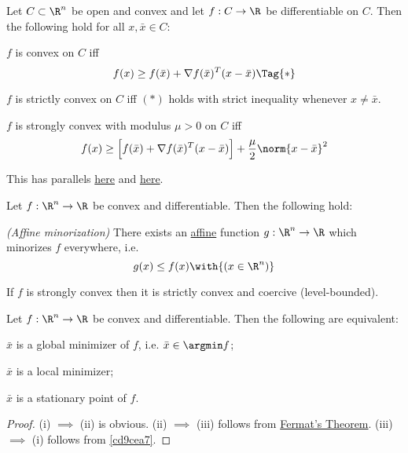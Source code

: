 Let $C\subset\R^n$ be open and convex and let $f:C\to\R$ be differentiable on
$C$. Then the following hold for all $x,\bar x\in C$:
\begin{enumerata}
  \item $f$ is convex on $C$ iff
  \begin{equation*}
    f(x)\geq f(\bar x)+\nabla f(\bar x)^T(x-\bar x)\Tag{*}
  \end{equation*}
  \item $f$ is strictly convex on $C$ iff $(*)$ holds with strict
  inequality whenever $x\neq\bar x$.
  \item $f$ is strongly convex with modulus $\mu>0$ on $C$ iff
  $$
    f(x)\geq\Bigl[f(\bar x)+\nabla f(\bar x)^T(x-\bar x)\Bigr]
    +\frac\mu2\norm{x-\bar x}^2
  $$
\end{enumerata}

This has parallels \href{a114065}{here} and \href{a8ddd0c}{here}.

\Corollary{}\label{aa63a8a}

Let $f:\R^n\to\R$ be convex and differentiable. Then the following hold:
\begin{enumerata}
  \item \textit{(Affine minorization)} There exists an
  \href{dcb7f73}{affine} function $g:\R^n\to\R$ which minorizes
  $f$ everywhere, i.e.
  $$
    g(x)\leq f(x)\with{(x\in\R^n)}
  $$
  \item If $f$ is strongly convex then it is strictly convex and coercive
        (level-bounded).
\end{enumerata}

\Corollary{}\label{f2986e2}

Let $f:\R^n\to\R$ be convex and differentiable. Then the following are
equivalent:
\begin{enumerati}
  \item $\bar x$ is a global minimizer of $f$, i.e. $\bar x\in\argmin f$;
  \item $\bar x$ is a local minimizer;
  \item $\bar x$ is a stationary point of $f$.
\end{enumerati}

\begin{proof}
  (i) $\implies$ (ii) is obvious. (ii) $\implies$ (iii) follows from
  \href{dc165c9}{Fermat's Theorem}. (iii) $\implies$ (i) follows
  from \autoref{cd9cea7}.
\end{proof}

\label{a8ddd0c}

